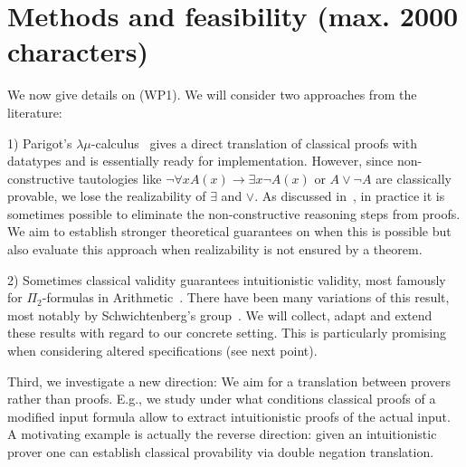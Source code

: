 \documentclass[a4paper,12pt]{article}
\begin{document}
	

\section{Methods and feasibility (max. 2000 characters)}
			
We now give details on (WP1).
We will consider two approaches from the literature:

1) Parigot's $\lambda\mu$-calculus~\cite{Parigot1} gives a direct translation of classical proofs with datatypes and is essentially ready for implementation.
However, since non-constructive tautologies like $\neg\forall xA(x)\to \exists x\neg A(x)$ or $A\vee \neg A$ {\color{blue} are classically provable}, we lose the realizability of $\exists$ and $\vee$.
As discussed in~\cite{practical}, in practice it is sometimes possible to eliminate the non-constructive reasoning steps from proofs.
We aim to establish stronger theoretical guarantees on when this is possible but also evaluate this approach when realizability is not ensured by a theorem.

2) Sometimes classical validity guarantees intuitionistic validity, most famously for $\Pi_2$-formulas in Arithmetic~\cite{Friedman}. There have been many variations of this result, most notably by Schwichtenberg's group~\cite{schwichtenberg}.
We will collect, adapt and extend these results with regard to our concrete setting. 
This is particularly promising when considering altered specifications (see next point).
%	

Third, we investigate a new direction:
We aim for a translation between provers rather than proofs.
E.g., we study under what conditions classical proofs of a modified input formula allow to extract intuitionistic proofs of the actual input.
A motivating example is actually the reverse direction:
given an intuitionistic prover one can establish classical provability via double negation translation.
	
\end{document}
